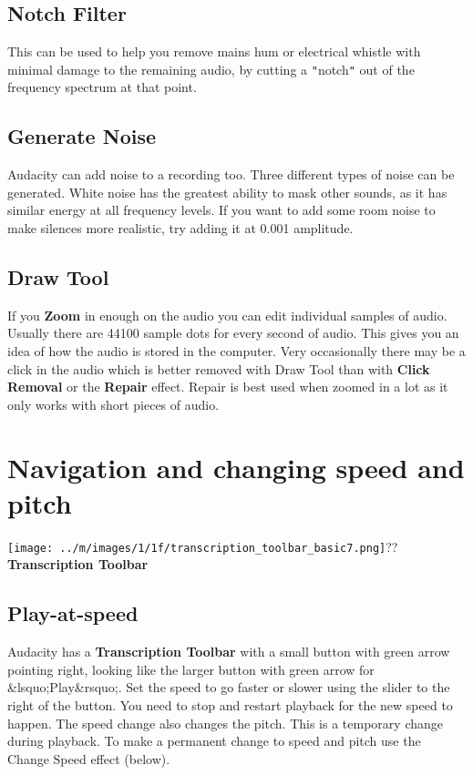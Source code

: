 \documentclass[twocolumn]{book}
\begin{document}
\subsection{Notch Filter}


This can be used to help you remove mains hum or electrical whistle with minimal damage to the remaining audio, by cutting a \texttt{{}"{}}notch\texttt{{}"{}} out of the frequency spectrum at that point.

\subsection{Generate Noise}


Audacity can add noise to a recording too. Three different types of noise can be generated. White noise has the greatest ability to mask other sounds, as it has similar energy at all frequency levels. If you want to add some room noise to make silences more realistic, try adding it at 0.001 amplitude.

\subsection{Draw Tool}


If you \textbf{Zoom} in enough on the audio you can edit individual samples of audio. Usually there are 44100 sample dots for every second of audio.  This  gives you an idea of how the audio is stored in the computer.  Very occasionally there may be a click in the audio which is better removed with Draw Tool than with \textbf{Click Removal} or the \textbf{Repair} effect.  Repair is best used when zoomed in a lot as it only works with short pieces of audio.



\section{Navigation and changing speed and pitch}

\par\texttt{[image: ../m/images/1/1f/transcription\_toolbar\_basic7.png]}??\textbf{Transcription Toolbar}

\subsection{Play-at-speed}


Audacity has a \textbf{Transcription Toolbar} with a small button with green arrow pointing right, looking like the larger button with green arrow for \&lsquo;Play\&rsquo;.  Set the speed to go faster or slower using the slider to the right of the button.  You need to stop and restart playback for the new speed to happen. The speed change also changes the pitch.  This is a temporary change during playback.  To make a permanent change to speed and pitch use the Change Speed effect (below).
\end{document}
